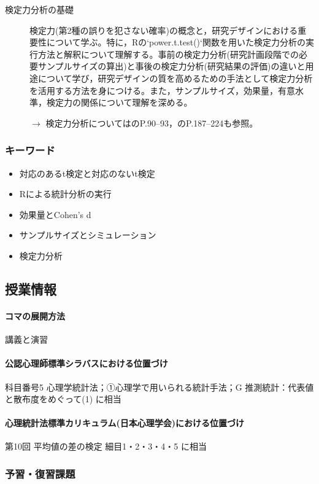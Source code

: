 \begin{description}
	\item[検定力分析の基礎] 検定力(第2種の誤りを犯さない確率)の概念と，研究デザインにおける重要性について学ぶ。特に，Rの`power.t.test()`関数を用いた検定力分析の実行方法と解釈について理解する。事前の検定力分析(研究計画段階での必要サンプルサイズの算出)と事後の検定力分析(研究結果の評価)の違いと用途について学び，研究デザインの質を高めるための手法として検定力分析を活用する方法を身につける。また，サンプルサイズ，効果量，有意水準，検定力の関係について理解を深める。
	      \begin{flushright}
		      $\to$ 検定力分析については\textcite{Kawabata201408}のP.90--93，\textcite{kosugi2023}のP.187--224も参照。
	      \end{flushright}

\end{description}
\subsubsection{キーワード}
\begin{itemize}
	\item 対応のあるt検定と対応のないt検定
	\item Rによる統計分析の実行
	\item 効果量とCohen's d
	\item サンプルサイズとシミュレーション
	\item 検定力分析
\end{itemize}
\subsection{授業情報}
\paragraph{コマの展開方法}
講義と演習
\paragraph{公認心理師標準シラバスにおける位置づけ}
科目番号5 心理学統計法；①心理学で用いられる統計手法；G 推測統計：代表値と散布度をめぐって(1) に相当
\paragraph{心理統計法標準カリキュラム(日本心理学会)における位置づけ}
第10回 平均値の差の検定 細目1・2・3・4・5 に相当
\subsubsection{予習・復習課題}
